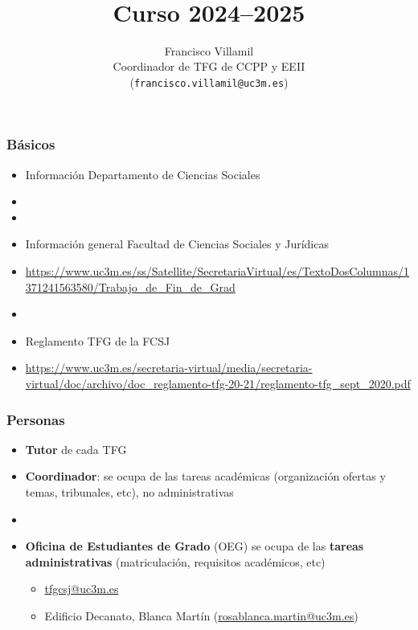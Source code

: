 \documentclass[aspectratio=43]{beamer}
\title{\BGyellow{Información \textbf{TFG}}\\\BGyellow{\textbf{Ciencias Politicas / Estudios Internacionales}}\\\vspace{10pt}\textbf{Curso 2024--2025}}
\author{Francisco Villamil\\Coordinador de TFG de CCPP y EEII\\(\texttt{francisco.villamil@uc3m.es})}
\date{}
\begin{document}

\begin{frame}
  \titlepage
\end{frame}

\begin{frame}
\frametitle{Básicos}
\centering

\begin{itemize}
  \item Información Departamento de Ciencias Sociales
  \item[] 
  \item[]
  \item Información general Facultad de Ciencias Sociales y Jurídicas
  \item[] {\footnotesize \url{https://www.uc3m.es/ss/Satellite/SecretariaVirtual/es/TextoDosColumnas/1371241563580/Trabajo_de_Fin_de_Grad}}
  \item[]
  \item Reglamento TFG de la FCSJ
  \item[] {\footnotesize \url{https://www.uc3m.es/secretaria-virtual/media/secretaria-virtual/doc/archivo/doc_reglamento-tfg-20-21/reglamento-tfg_sept_2020.pdf}}
\end{itemize}

\end{frame}

\begin{frame}
\frametitle{Personas}
\centering

\begin{itemize}
  \item \textbf{Tutor} de cada TFG
  \item \textbf{Coordinador}: se ocupa de las tareas académicas (organización ofertas y temas, tribunales, etc), no administrativas
  \item[]
  \item \textbf{Oficina de Estudiantes de Grado} (OEG) se ocupa de las \textbf{tareas administrativas} (matriculación, requisitos académicos, etc)
  \begin{itemize}
    \item \href{tfgcsj@uc3m.es}{tfgcsj@uc3m.es}
    \item Edificio Decanato, Blanca Martín {\footnotesize (\url{rosablanca.martin@uc3m.es})}
  \end{itemize}
\end{itemize}

\end{frame}
\end{document}
